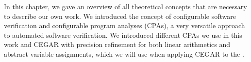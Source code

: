 In this chapter, we gave an overview of all theoretical concepts that are necessary to describe our own work. We introduced the concept of configurable software verification and configurable program analyses (CPAs), a very versatile approach to automated software verification. We introduced different CPAs we use in this work and CEGAR with precision refinement for both linear arithmetics and abstract variable assignments, which we will use when applying CEGAR to the \symbolicExecutionCPA.
